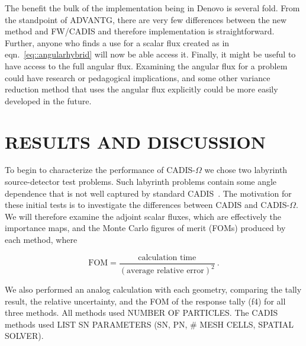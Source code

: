 \documentclass[12pt]{article}
\begin{document}
The benefit the bulk of the implementation being in Denovo is several fold. 
From the standpoint of ADVANTG, there are very few differences between the new method and FW/CADIS and therefore implementation is straightforward.
Further, anyone who finds a use for a scalar flux created as in eqn.~\eqref{eq::angularhybrid} will now be able  access it.
Finally, it might be useful to have access to the full angular flux. 
Examining the angular flux for a problem could have research or pedagogical implications, and some other variance reduction method that uses the angular flux explicitly could be more easily developed in the future.

%
\section{RESULTS AND DISCUSSION} 
\label{sect::results}

To begin to characterize the performance of CADIS-$\Omega$ we chose two labyrinth source-detector test problems.
Such labyrinth problems contain some angle dependence that is not well captured by standard CADIS~\cite{Peplow-ORNL}. 
The motivation for these initial tests is to investigate the differences between CADIS and CADIS-$\Omega$.
We will therefore examine the adjoint scalar fluxes, which are effectively the importance maps, and the Monte Carlo figures of merit (FOMs) produced by each method, where 

\[\text{FOM} = \frac{\text{calculation time}}{(\text{average relative error})^2}\:. \]


We also performed an analog calculation with each geometry, comparing  the tally result, the relative uncertainty, and the FOM of the response tally (f4) for all three methods.
All methods used NUMBER OF PARTICLES. 
The CADIS methods used LIST SN PARAMETERS (SN, PN, \# MESH CELLS, SPATIAL SOLVER).
\end{document}

